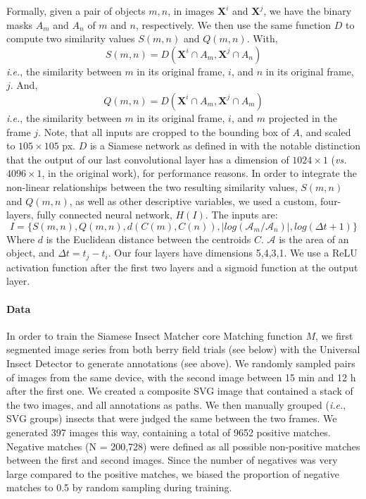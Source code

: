 \documentclass[12pt]{article}
\begin{document}
\begin{linenumbers}
		
		Formally, given a pair of objects $m, n$, in images $\mathbf{X}^i$ and $\mathbf{X}^j$, we have the binary masks $A_m$ and $A_n$ of $m$ and $n$, respectively.
		We then use the same function $D$ to compute two similarity values $S(m,n)$ and $Q(m,n)$. 
		With,
		$$
		S(m,n) = D(\mathbf{X}^i \cap A_m , \mathbf{X}^j \cap A_n )
		$$
		\emph{i.e.}, the similarity between $m$ in its original frame, $i$, and $n$ in its original frame, $j$. And,
		$$
		Q(m,n) = D(\mathbf{X}^i \cap  A_m , \mathbf{X}^j \cap A_m )
		$$
		\emph{i.e.}, the similarity between $m$ in its original frame, $i$, and $m$ projected in the frame $j$. Note, that all inputs are cropped to the bounding box of $A$, and scaled to $105 \times{} 105$ px. $D$ is a Siamese network as defined in\cite{koch_siamese_2015} with the notable distinction that the output of our last convolutional layer has a dimension of $1024 \times{} 1$ (\emph{vs.} $4096 \times{} 1$, in the original work), for performance reasons. 
		In order to integrate the non-linear relationships between the two resulting similarity values, $S(m,n)$ and $Q(m,n)$, as well as other descriptive variables, we used a custom, four-layers, fully connected neural network, $H(I)$. The inputs are: 
		$$
		I=\{ S(m,n), Q(m,n), d(C(m), C(n)), |log(\mathcal{A}_m/\mathcal{A}_n)|, log(\Delta t + 1)\}
		$$ Where $d$ is the Euclidean distance between the centroids $C$. $\mathcal{A}$ is the area of an object, and $\Delta t = t_j- t_i$. Our four layers have dimensions {5,4,3,1}. We use a ReLU activation function after the first two layers and a sigmoid function at the output layer.
		
		\paragraph{Data}
		In order to train the Siamese Insect Matcher core Matching function $M$, we first segmented image series from both berry field trials (see below) with the Universal Insect Detector to generate annotations (see above). We randomly sampled pairs of images from the same device, with the second image between 15 min and 12 h after the first one. We created a composite SVG image that contained a stack of the two images, and all annotations as paths. We then manually grouped (\emph{i.e.}, SVG groups) insects that were judged the same between the two frames. We generated 397 images this way, containing a total of 9652 
		positive matches. Negative matches (N = 200,728) were defined as all possible non-positive matches between the first and second images. Since the number of negatives was very large compared to the positive matches, we biased the proportion of negative matches to 0.5 by random sampling during training.
		

\end{linenumbers}
\end{document}
